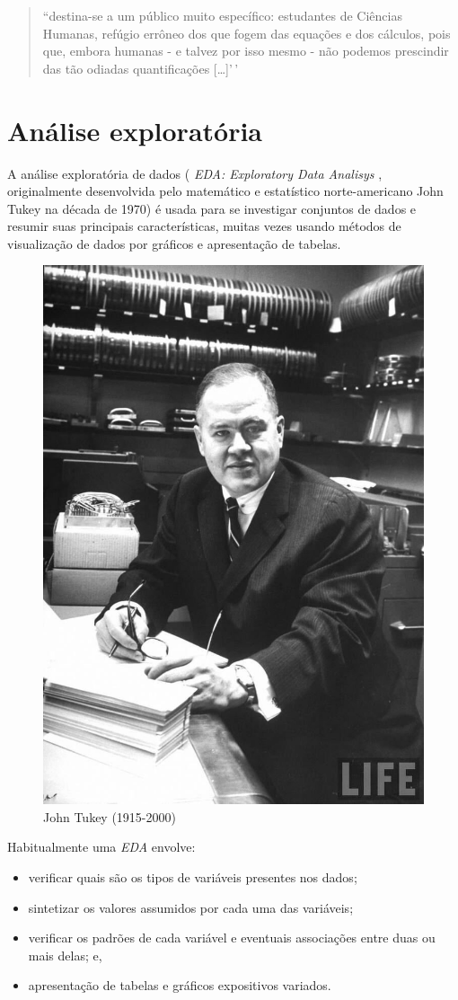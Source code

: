 \documentclass[
]{book}
\providecommand{\tightlist}{%
  \setlength{\itemsep}{0pt}\setlength{\parskip}{0pt}}
\begin{document}
\begin{quote}
``destina-se a um público muito específico: estudantes de Ciências Humanas, refúgio errôneo dos que fogem das equações e dos cálculos, pois que, embora humanas - e talvez por isso mesmo - não podemos prescindir das tão odiadas quantificações {[}\ldots{]}'\,'
\end{quote}

\hypertarget{anuxe1lise-exploratuxf3ria}{%
\section{Análise exploratória}\label{anuxe1lise-exploratuxf3ria}}

A análise exploratória de dados ( \emph{EDA: Exploratory Data Analisys} , originalmente desenvolvida pelo matemático e estatístico norte-americano John Tukey na década de 1970) é usada para se investigar conjuntos de dados e resumir suas principais características, muitas vezes usando métodos de visualização de dados por gráficos e apresentação de tabelas.

\hfill\break

\begin{figure}

{\centering \includegraphics[width=0.5\linewidth]{images3/tukey} 

}

\caption{John Tukey (1915-2000)}\label{fig:unnamed-chunk-13}
\end{figure}

\hfill\break

Habitualmente uma \emph{EDA} envolve:

\begin{itemize}
\tightlist
\item
  verificar quais são os tipos de variáveis presentes nos dados;
\item
  sintetizar os valores assumidos por cada uma das variáveis;
\item
  verificar os padrões de cada variável e eventuais associações entre duas ou mais delas; e,
\item
  apresentação de tabelas e gráficos expositivos variados.
\end{itemize}
\end{document}
